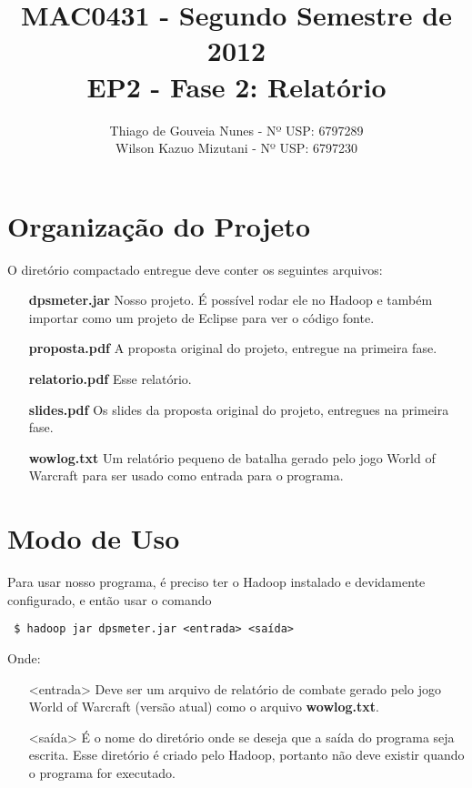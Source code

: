 \documentclass[a4paper,11pt]{article}
\title{MAC0431 - Segundo Semestre de 2012 \\
       EP2 - Fase 2: Relatório}
\author{Thiago de Gouveia Nunes - Nº USP: 6797289 \\
        Wilson Kazuo Mizutani - Nº USP: 6797230}
\begin{document}
\maketitle

\section{Organização do Projeto}

  O diretório compactado entregue deve conter os seguintes arquivos:
  
  \begin{itemize}
    \item[\textbf{dpsmeter.jar}]
      Nosso projeto. É possível rodar ele no Hadoop e também importar como um
      projeto de Eclipse para ver o código fonte.
    \item[\textbf{proposta.pdf}]
      A proposta original do projeto, entregue na primeira fase.
    \item[\textbf{relatorio.pdf}]
      Esse relatório.
    \item[\textbf{slides.pdf}]
      Os slides da proposta original do projeto, entregues na primeira fase.
    \item[\textbf{wowlog.txt}]
      Um relatório pequeno de batalha gerado pelo jogo World of Warcraft para
      ser usado como entrada para o programa.
  \end{itemize}
  
\section{Modo de Uso}

  Para usar nosso programa, é preciso ter o Hadoop instalado e devidamente
  configurado, e então usar o comando
  
  \begin{verbatim} $ hadoop jar dpsmeter.jar <entrada> <saída> \end{verbatim}
  
  Onde:
  
  \begin{itemize}
    \item[<entrada>]
      Deve ser um arquivo de relatório de combate gerado pelo jogo World of
      Warcraft (versão atual) como o arquivo \textbf{wowlog.txt}.
    \item[<saída>]
      É o nome do diretório onde se deseja que a saída do programa seja escrita.
      Esse diretório é criado pelo Hadoop, portanto não deve existir quando o
      programa for executado.
  \end{itemize}
  
\end{document}
